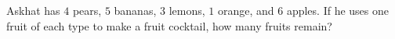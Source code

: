 Askhat has $4$ pears, $5$ bananas, $3$ lemons, $1$ orange, and $6$ apples. If he uses one fruit of each type to make a fruit cocktail, how many fruits remain?
